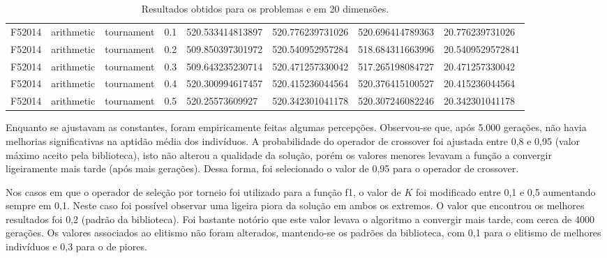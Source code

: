 \begin{table}[!ht]
{\begin{tabular}{llllllll}
            F52014                                     & arithmetic & tournament & 0.1  & 520.533414813897 & 520.776239731026 & 520.696414789363 & 20.776239731026  \\
            F52014                                     & arithmetic & tournament & 0.2  & 509.850397301972 & 520.540952957284 & 518.684311663996 & 20.5409529572841 \\
            F52014                                     & arithmetic & tournament & 0.3  & 509.643235230714 & 520.471257330042 & 517.265198084727 & 20.471257330042  \\
            F52014                                     & arithmetic & tournament & 0.4  & 520.300994617457 & 520.415236044564 & 520.376415100527 & 20.415236044564  \\
            F52014                                     & arithmetic & tournament & 0.5  & 520.25573609927  & 520.342301041178 & 520.307246082246 & 20.342301041178  \\
            \toprule
        \end{tabular}%
    }
    \caption{Resultados obtidos para os problemas  e  em 20 dimensões.
    }%
    \label{tab:fitness_20}
\end{table}

Enquanto se ajustavam as constantes, foram empiricamente feitas algumas percepções.
Observou-se que, após 5.000 gerações, não havia melhorias significativas na aptidão média dos indivíduos.
A probabilidade do operador de crossover foi ajustada entre 0,8 e 0,95 (valor máximo aceito pela biblioteca), isto não alterou a qualidade da solução, porém os valores menores levavam a função a convergir ligeiramente mais tarde (após mais gerações).
Dessa forma, foi selecionado o valor de 0,95 para o operador de crossover.

Nos casos em que o operador de seleção por torneio foi utilizado para a função \gls{f1}, o valor de \( K \) foi modificado entre 0,1 e 0,5 aumentando sempre em 0,1.
Neste caso foi possível observar uma ligeira piora da solução em ambos os extremos.
O valor que encontrou os melhores resultados foi 0,2 (padrão da biblioteca).
Foi bastante notório que este valor levava o algoritmo a convergir mais tarde, com cerca de 4000 gerações.
Os valores associados ao elitismo não foram alterados, mantendo-se os padrões da biblioteca, com 0,1 para o elitismo de melhores indivíduos e 0,3 para o de piores.